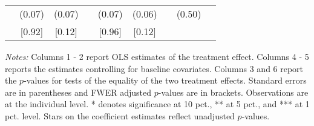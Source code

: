 \begin{table}[htbp]
{\begin{threeparttable}
\begin{tabular}{l*{8}{c}}
          &   (0.07)&   (0.07)&         &   (0.07)&   (0.06)&         &   (0.50)&         \\
          &   [0.92]&   [0.12]&         &   [0.96]&   [0.12]&         &         &         \\
\bottomrule \end{tabular} \begin{tablenotes}[flushleft] \footnotesize \item \emph{Notes:} Columns 1 - 2 report OLS estimates of the treatment effect. Columns 4 - 5 reports the estimates controlling for baseline covariates. Columns 3 and 6 report the \(p\)-values for tests of the equality of the two treatment effects. Standard errors are in parentheses and FWER adjusted \(p\)-values are in brackets. Observations are at the individual level. * denotes significance at 10 pct., ** at 5 pct., and *** at 1 pct. level. Stars on the coefficient estimates reflect unadjusted \(p\)-values. \end{tablenotes} \end{threeparttable} } \end{table}

